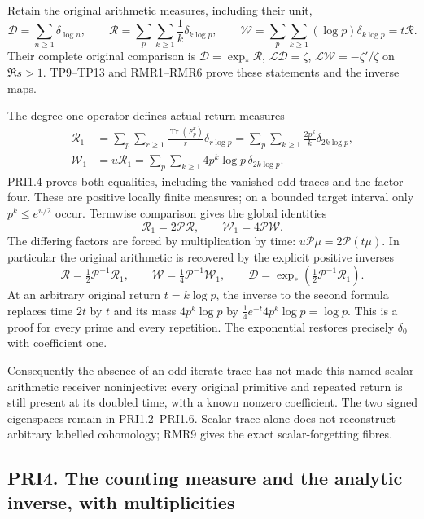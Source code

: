 \documentclass[
]{article}
\begin{document}
Retain the original arithmetic measures, including their unit, \[
\mathcal D=\sum_{n\ge1}\delta_{\log n},\qquad
\mathcal R=\sum_p\sum_{k\ge1}\frac1k\delta_{k\log p},\qquad
\mathcal W=\sum_p\sum_{k\ge1}(\log p)\delta_{k\log p}=t\mathcal R.
\tag{PRI3.1}
\] Their complete original comparison is
\(\mathcal D=\exp_*\mathcal R\), \(\mathcal L\mathcal D=\zeta\),
\(\mathcal L\mathcal W=-\zeta'/\zeta\) on \(\Re s>1\). TP9--TP13 and
RMR1--RMR6 prove these statements and the inverse maps.

The degree-one operator defines actual return measures \[
\begin{split}
\mathcal R_1&=\sum_p\sum_{r\ge1}\frac{\operatorname{Tr}(F_p^r)}r
                    \delta_{r\log p}
=\sum_p\sum_{k\ge1}\frac{2p^k}{k}\delta_{2k\log p},\\
\mathcal W_1&=u\mathcal R_1
=\sum_p\sum_{k\ge1}4p^k\log p\,\delta_{2k\log p}.
\end{split}
\tag{PRI3.2}
\] PRI1.4 proves both equalities, including the vanished odd traces and
the factor four. These are positive locally finite measures; on a
bounded target interval only \(p^k\le e^{u/2}\) occur. Termwise
comparison gives the global identities \[
\boxed{\mathcal R_1=2\mathscr P\mathcal R,\qquad
\mathcal W_1=4\mathscr P\mathcal W.}
\tag{PRI3.3}
\] The differing factors are forced by multiplication by time:
\(u\mathscr P\mu=2\mathscr P(t\mu)\). In particular the original
arithmetic is recovered by the explicit positive inverses \[
\boxed{\mathcal R=\tfrac12\mathscr P^{-1}\mathcal R_1,
\qquad\mathcal W=\tfrac14\mathscr P^{-1}\mathcal W_1,
\qquad\mathcal D=\exp_*(\tfrac12\mathscr P^{-1}\mathcal R_1).}
\tag{PRI3.4}
\] At an arbitrary original return \(t=k\log p\), the inverse to the
second formula replaces time \(2t\) by \(t\) and its mass \(4p^k\log p\)
by \(\tfrac14e^{-t}4p^k\log p=\log p\). This is a proof for every prime
and every repetition. The exponential restores precisely \(\delta_0\)
with coefficient one.

Consequently the absence of an odd-iterate trace has not made this named
scalar arithmetic receiver noninjective: every original primitive and
repeated return is still present at its doubled time, with a known
nonzero coefficient. The two signed eigenspaces remain in
PRI1.2--PRI1.6. Scalar trace alone does not reconstruct arbitrary
labelled cohomology; RMR9 gives the exact scalar-forgetting fibres.

\subsection{PRI4. The counting measure and the analytic inverse, with
multiplicities}\label{pri4.-the-counting-measure-and-the-analytic-inverse-with-multiplicities}
\end{document}
